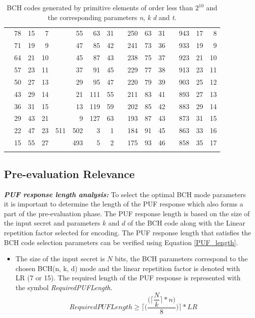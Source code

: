 \begin{table}[!ht]
\begin{center}
\begin{tabular}{rrrr|rrrr|rrrr|rrrr}
&78&15&7&&55&63&31&&250&63&31&&943&17&8\\
&71&19&9&&47&85&42&&241&73&36&&933&19&9\\
&64&21&10&&45&87&43&&238&75&37&&923&21&10\\
&57&23&11&&37&91&45&&229&77&38&&913&23&11\\
&50&27&13&&29&95&47&&220&79&39&&903&25&12\\
&43&29&14&&21&111&55&&211&83&41&&893&27&13\\
&36&31&15&&13&119&59&&202&85&42&&883&29&14\\
&29&43&21&&9&127&63&&193&87&43&&873&31&15\\
&22&47&23&511&502&3&1&&184&91&45&&863&33&16\\
&15&55&27&&493&5&2&&175&93&46&&858&35&17\\
\hline
\addlinespace
\bottomrule
\end{tabular}
\end{center}
\caption{BCH codes generated by primitive elements of order less than $2^{10}$ and the corresponding parameters \emph{n}, \emph{k} \emph{d} and \emph{t}.}
\label{tab:BCHmodes}
\end{table}

\subsection{Pre-evaluation Relevance}
\emph{\textbf{PUF response length analysis:}} To select the optimal BCH mode parameters it is important to determine the length of the PUF response which also forms a part of the pre-evaluation phase. The PUF response length is based on the size of the input secret and parameters $k$ and $d$ of the BCH code along with the Linear repetition factor selected for encoding. The PUF response length that satisfies the BCH code selection parameters can be verified using Equation
		\ref{PUF_length}.
\begin{itemize}
	\item The size of the input secret is $N$ bits, the BCH parameters correspond to the chosen BCH(n, k, d) mode and the linear repetition factor is denoted with LR (7 or 15). The required length of the PUF response is represented with the symbol \emph{RequiredPUFLength}\cite{71}.\\
		\begin{equation}
			RequiredPUFLength \geq \Bigg\lceil\Bigg(\dfrac{\Bigg(\Bigg\lceil\dfrac{N}{k}\Bigg\rceil
		* n\Bigg)}{8}\Bigg)\Bigg\rceil * LR
		\label{PUF_length}
		\end{equation}
\end{itemize}

